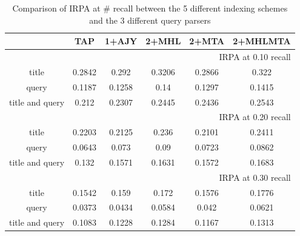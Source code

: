 \vspace{-0.5cm}
\begin{table}[h!]
\centering
\caption{Comparison of IRPA at \# recall between the 5 different indexing schemes and the 3 different query parsers}
\vspace{-0.1cm}
\label{my-label}
\begin{tabular}{cccccc}
\hline
 & TAP & 1+AJY & 2+MHL & 2+MTA & 2+MHLMTA \\ \hline
\multicolumn{6}{r}{IRPA at 0.10 recall}                                                                  \\ \hline
title           & 0.2842              & 0.292               & 0.3206           & 0.2866              & 0.322              \\
query           & 0.1187              & 0.1258              & 0.14            & 0.1297              & 0.1415              \\
title and query & 0.212              & 0.2307              & 0.2445           & 0.2436              & 0.2543              \\ \hline
\multicolumn{6}{r}{IRPA at 0.20 recall}                                                                  \\ \hline
title           & 0.2203              & 0.2125              & 0.236           & 0.2101              & 0.2411             \\
query           & 0.0643              & 0.073              & 0.09              & 0.0723              & 0.0862             \\
title and query & 0.132              & 0.1571              & 0.1631           & 0.1572              & 0.1683                \\ \hline
\multicolumn{6}{r}{IRPA at 0.30 recall}                                                                  \\ \hline
title           & 0.1542             & 0.159             & 0.172              & 0.1576             & 0.1776            \\
query          & 0.0373              & 0.0434             & 0.0584           & 0.042            & 0.0621            \\
title and query & 0.1083              & 0.1228              & 0.1284             & 0.1167               & 0.1313             \\ \hline
\end{tabular}
\end{table}
\vspace{-0.3cm}
